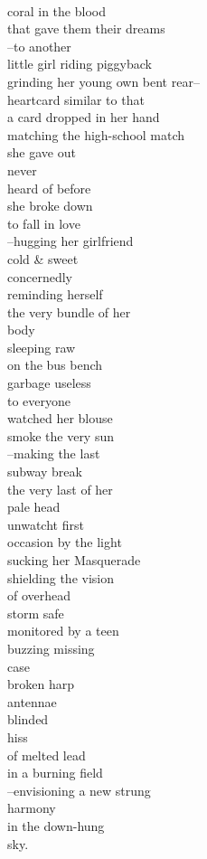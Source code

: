 \documentclass[smalldemyvopaper,11pt,twoside,onecolumn,openright,extrafontsizes]{memoir}
\newlength\drop
\begin{document}
\\coral in the blood
\\that gave them their dreams
\\--to another
\\little girl riding piggyback
\\grinding her young own bent rear--
\\heartcard similar to that
\\a card dropped in her hand
\\matching the high-school match
\\she gave out
\\never
\\heard of before
\\she broke down
\\to fall in love
\\--hugging her girlfriend
\\cold \& sweet
\\concernedly
\\reminding herself
\\the very bundle of her
\\body
\\sleeping raw
\\on the bus bench
\\garbage useless
\\to everyone
\\watched her blouse
\\smoke the very sun
\\--making the last
\\subway break
\\the very last of her
\\pale head
\\unwatcht first
\\occasion by the light
\\sucking her Masquerade
\\shielding the vision
\\of overhead
\\storm safe
\\monitored by a teen
\\buzzing missing
\\case
\\broken harp
\\antennae
\\blinded
\\hiss
\\of melted lead
\\in a burning field
\\--envisioning a new strung
\\harmony
\\in the down-hung
\\sky.
\end{document}
